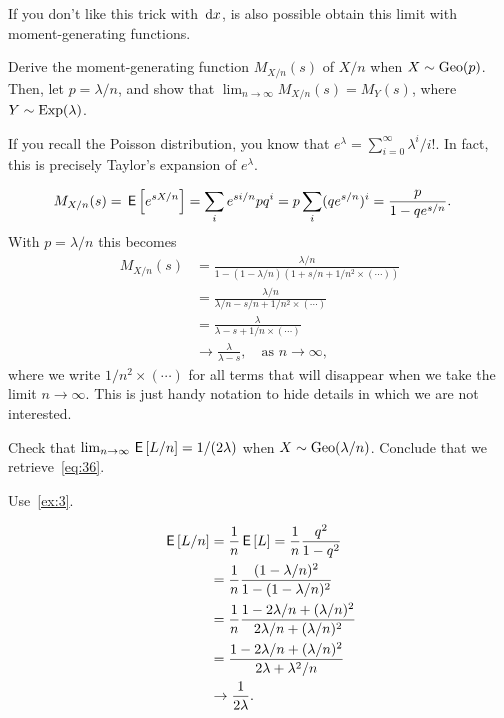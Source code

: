 \documentclass[a4paper,11pt]{article}
\begin{document}
If you don't like this trick with $\,\textrm{d}x$, is also possible obtain this limit with moment-generating functions.

\begin{exercise}
Derive the moment-generating function $M_{X/n}(s)$ of $X/n$ when $X\sim \mathrm{Geo}(p)$.
Then, let $p = \lambda/n$, and show that $\lim_{n\to\infty}M_{X/n}(s) = M_{Y}(s)$, where $Y \sim \mathrm{Exp}(\lambda)$.
\begin{hint}
  If you recall the Poisson distribution, you know that $e^{\lambda} = \sum_{i=0}^{\infty}\lambda^{i}/i!$.
  In fact, this is precisely Taylor's expansion of $e^{\lambda}$.
\end{hint}
\begin{solution}
  \begin{align}
    \label{eq:20}
M_{X/n}(s)
&= \,\mathsf{E}\left[e^{s X/n}\right] = \sum_{i} e^{s i/n} p q^{i} = p\sum_{i} (qe^{s/n})^{i} = \frac{p}{1-qe^{s/n}}.
  \end{align}
With $p=\lambda/n$ this becomes
  \begin{align}
M_{X/n}(s)
&= \frac{\lambda/n}{1-(1-\lambda/n) (1+s/n + 1/n^{2}\times(\cdots))} \\
&= \frac{\lambda/n}{\lambda/n - s/n + 1/n^{2}\times (\cdots)} \\
&= \frac{\lambda}{\lambda - s + 1/n\times(\cdots)} \\
&\to \frac{\lambda}{\lambda - s}, \quad\text{as }  n\to \infty,
  \end{align}
  where we write $1/n^{2}\times(\cdots)$ for all terms that will disappear when we take the limit $n\to \infty$.
  This is just handy notation to hide details in which we are not interested.
\end{solution}
\end{exercise}

\begin{exercise}\label{ex:11}
Check that $\lim_{n\to\infty}\,\mathsf{E}\left[L/n\right] = 1/(2\lambda)$ when $X\sim \mathrm{Geo}(\lambda/n)$. Conclude that  we retrieve~\cref{eq:36}.
\begin{hint}
  Use~\cref{ex:3}.
\end{hint}
\begin{solution}
  \begin{align}
    \label{eq:21}
\,\mathsf{E}\left[L/n\right]  &= \frac 1 n \,\mathsf{E}\left[L\right] = \frac 1 n \frac{q^2}{1-q^{2}} \\
 &= \frac 1 n \frac{(1-\lambda/n)^2}{1-(1-\lambda/n)^{2}} \\
 &= \frac 1 n \frac{1-2 \lambda/n + (\lambda/n)^2}{2 \lambda /n + (\lambda/n)^{2}} \\
 &= \frac{1-2 \lambda/n + (\lambda/n)^2}{2 \lambda + \lambda^{2}/n} \\
&\to \frac 1{2\lambda}.
  \end{align}
\end{solution}
\end{exercise}
\end{document}

